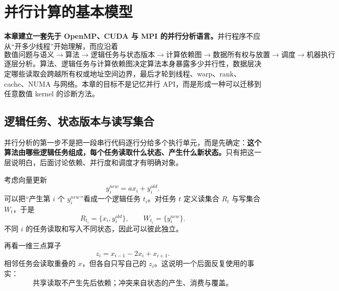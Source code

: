 \chapter{并行计算的基本模型}
\label{ch:parallel-model}

\begin{keybox}
\textbf{本章建立一套先于 OpenMP、CUDA 与 MPI 的并行分析语言。}并行程序不应从“开多少线程”开始理解，而应沿着
\begin{equation}
\boxed{
\text{数值问题与语义}
\rightarrow
\text{算法}
\rightarrow
\text{逻辑任务与状态版本}
\rightarrow
\text{计算依赖图}
\rightarrow
\text{数据所有权与放置}
\rightarrow
\text{调度}
\rightarrow
\text{机器执行}
}
\label{eq:parallel-analysis-chain}
\end{equation}
逐层分析。算法、逻辑任务与计算依赖图决定算法本身暴露多少并行性，数据层决定哪些读取会跨越所有权或地址空间边界，最后才轮到线程、warp、rank、cache、NUMA 与网络。本章的目标不是记忆并行 API，而是形成一种可以迁移到任意数值 kernel 的诊断方法。
\end{keybox}

\section{逻辑任务、状态版本与读写集合}

并行分析的第一步不是把一段串行代码逐行分给多个执行单元，而是先确定：\textbf{这个算法由哪些逻辑任务组成，每个任务读取什么状态、产生什么新状态。}只有把这一层说明白，后面讨论依赖、并行度和调度才有明确对象。

考虑向量更新
\begin{equation}
y_i^{new}=a x_i+y_i^{old}.
\label{eq:parallel-vector-update}
\end{equation}
可以把“产生第 $i$ 个 $y_i^{new}$”看成一个逻辑任务 $t_i$。对任务 $t$ 定义读集合 $R_t$ 与写集合 $W_t$，于是
\begin{equation}
R_{t_i}=\{x_i,y_i^{old}\},
\qquad
W_{t_i}=\{y_i^{new}\}.
\end{equation}
不同 $i$ 的任务读取和写入不同状态，因此可以彼此独立。

再看一维三点算子
\begin{equation}
z_i=x_{i-1}-2x_i+x_{i+1}.
\label{eq:parallel-three-point}
\end{equation}
相邻任务会读取重叠的 $x$，但各自只写自己的 $z_i$。这说明一个后面反复使用的事实：
\begin{equation}
\boxed{
\text{共享读取不产生先后依赖；冲突来自状态的产生、消费与覆盖。}
}
\label{eq:parallel-shared-read}
\end{equation}

